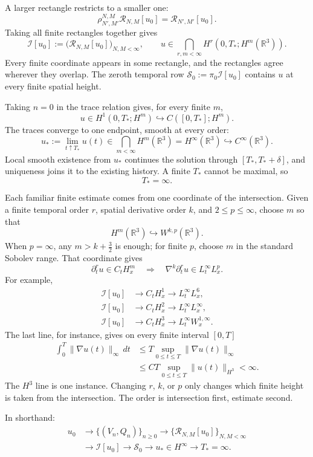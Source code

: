 \documentclass[11pt]{article}
\newcommand{\R}{\mathbb R}
\newcommand{\I}{\mathcal I}
\begin{document}
A larger rectangle restricts to a smaller one:
\[
  \rho_{N',M'}^{N,M}\mathcal R_{N,M}[u_0]
  =\mathcal R_{N',M'}[u_0].
\]
Taking all finite rectangles together gives
\[
  \I[u_0]
  :=\bigl(\mathcal R_{N,M}[u_0]\bigr)_{N,M<\infty},
  \qquad
  u\in
  \bigcap_{r,m<\infty}
  H^r(0,T_*;H^m(\R^3)).
\]
Every finite coordinate appears in some rectangle, and the rectangles agree
wherever they overlap. The zeroth temporal row
\(\mathscr S_0:=\pi_0\I[u_0]\) contains \(u\) at every finite spatial height.

Taking \(n=0\) in the trace relation gives, for every finite \(m\),
\[
  u\in H^1(0,T_*;H^m)
  \hookrightarrow C([0,T_*];H^m).
\]
The traces converge to one endpoint, smooth at every order:
\[
  u_*:=\lim_{t\uparrow T_*}u(t)
  \in\bigcap_{m<\infty}H^m(\R^3)
  =H^\infty(\R^3)
  \hookrightarrow C^\infty(\R^3).
\]
Local smooth existence from \(u_*\) continues the solution through
\([T_*,T_*+\delta]\), and uniqueness joins it to the existing history. A finite
\(T_*\) cannot be maximal, so
\[
  T_*=\infty.
\]

Each familiar finite estimate comes from one coordinate of the intersection.
Given a finite temporal order \(r\), spatial derivative order
\(k\), and \(2\leq p\leq\infty\), choose \(m\) so that
\[
  H^m(\R^3)\hookrightarrow W^{k,p}(\R^3).
\]
When \(p=\infty\), any \(m>k+\tfrac32\) is enough; for finite \(p\), choose
\(m\) in the standard Sobolev range. That coordinate gives
\[
  \partial_t^ru\in C_tH_x^m
  \quad\Longrightarrow\quad
  \nabla^k\partial_t^ru\in L_t^\infty L_x^p.
\]
For example,
\[
\begin{aligned}
  \I[u_0]&\longrightarrow C_tH_x^1
    \longrightarrow L_t^\infty L_x^6,
  \\
  \I[u_0]&\longrightarrow C_tH_x^2
    \longrightarrow L_t^\infty L_x^\infty,
  \\
  \I[u_0]&\longrightarrow C_tH_x^3
    \longrightarrow L_t^\infty W_x^{1,\infty}.
\end{aligned}
\]
The last line, for instance, gives on every finite interval \([0,T]\)
\[
\begin{aligned}
  \int_0^T\|\nabla u(t)\|_\infty\,dt
  &\leq T\sup_{0\leq t\leq T}\|\nabla u(t)\|_\infty
  \\
  &\leq C T\sup_{0\leq t\leq T}\|u(t)\|_{H^3}
  <\infty.
\end{aligned}
\]
The \(H^3\) line is one instance. Changing \(r\), \(k\), or \(p\) only changes
which finite height is taken from the intersection. The order is intersection
first, estimate second.

In shorthand:
\[
\begin{aligned}
  u_0
  &\longrightarrow \{(V_n,Q_n)\}_{n\geq0}
  \longrightarrow \{\mathcal R_{N,M}[u_0]\}_{N,M<\infty}
  \\
  &\longrightarrow \I[u_0]
  \longrightarrow \mathscr S_0
  \longrightarrow u_*\in H^\infty
  \longrightarrow T_*=\infty.
\end{aligned}
\]
\end{document}
